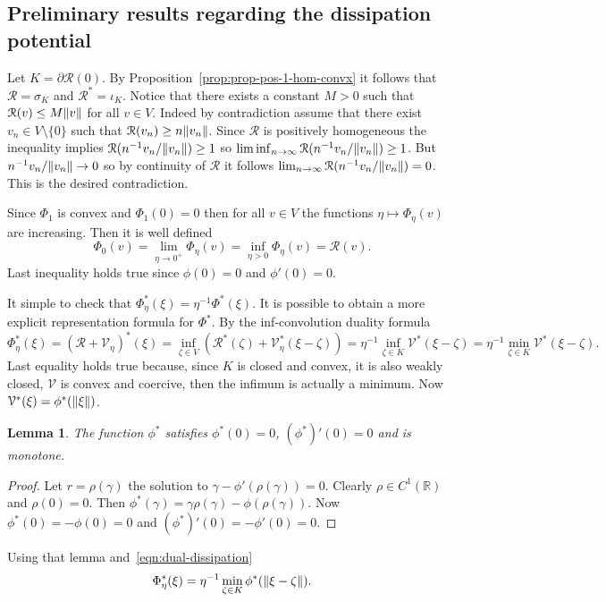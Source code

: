 \documentclass[letterpaper,oneside]{amsart}
\numberwithin{equation}{section}
\newtheorem{lemma}[theorem]{Lemma}
\theoremstyle{definition}
\DeclarePairedDelimiter{\norm}{\lVert}{\rVert}
\begin{document}
\subsection{Preliminary results regarding the dissipation potential}

Let $K=\partial\mathcal{R}(0)$. By Proposition~\ref{prop:prop-pos-1-hom-convx} it follows that $\mathcal{R}=\sigma_K$ and $\mathcal{R}^*=\iota_K$. Notice that there exists a constant $M>0$ such that $\mathcal{R}(v)\le M\norm{v}$ for all $v\in V$. Indeed by contradiction assume that there exist $v_n\in V\setminus\{0\}$ such that $\mathcal{R}(v_n)\ge n\norm{v_n}$. Since $\mathcal{R}$ is positively homogeneous the inequality implies $\mathcal{R}(n^{-1}v_n/\norm{v_n})\ge1$ so $\liminf_{n\to\infty}\mathcal{R}(n^{-1}v_n/\norm{v_n})\ge1$. But $n^{-1}v_n/\norm{v_n}\to0$ so by continuity of $\mathcal{R}$ it follows $\lim_{n\to\infty}\mathcal{R}(n^{-1}v_n/\norm{v_n})=0$. This is the desired contradiction.

Since $\Phi_1$ is convex and $\Phi_1(0)=0$ then for all $v\in V$ the functions $\eta\mapsto\Phi_\eta(v)$ are increasing. Then it is well defined
\begin{equation*}
\Phi_0(v)=\lim_{\eta\to0^+}\Phi_\eta(v)=\inf_{\eta>0}\Phi_\eta(v)=\mathcal{R}(v).
\end{equation*}
Last inequality holds true since $\phi(0)=0$ and $\phi'(0)=0$.

It simple to check that $\Phi_\eta^*(\xi)=\eta^{-1}\Phi^*(\xi)$. It is possible to obtain a more explicit representation formula for $\Phi^*$. By the inf-convolution duality formula
\begin{equation}
\label{eqn:dual-dissipation}
\Phi_\eta^*(\xi)=\left(\mathcal{R}+\mathcal{V}_\eta\right)^*(\xi)=\inf_{\zeta\in V}\left(\mathcal{R}^*(\zeta)+\mathcal{V}_\eta^*(\xi-\zeta)\right)=\eta^{-1}\inf_{\zeta\in K}\mathcal{V}^*(\xi-\zeta)=\eta^{-1}\min_{\zeta\in K}\mathcal{V}^*(\xi-\zeta).
\end{equation}
Last equality holds true because, since $K$ is closed and convex, it is also weakly closed, $\mathcal{V}$ is convex and coercive, then the infimum is actually a minimum. Now $\mathcal{V}^*(\xi)=\phi^*(\norm{\xi})$. \begin{lemma}
The function $\phi^*$ satisfies $\phi^*(0)=0$, $(\phi^*)'(0)=0$ and is monotone.
\end{lemma}
\begin{proof}
Let $r=\rho(\gamma)$ the solution to $\gamma-\phi'(\rho(\gamma))=0$. Clearly $\rho\in C^1(\mathbb{R})$ and $\rho(0)=0$. Then $\phi^*(\gamma)=\gamma\rho(\gamma)-\phi(\rho(\gamma))$. Now $\phi^*(0)=-\phi(0)=0$ and $(\phi^*)'(0)=-\phi'(0)=0$.
\end{proof}
Using that lemma and~\eqref{eqn:dual-dissipation}
\begin{equation}
\label{eqn:dual-dissipation-1}
\Phi_\eta^*(\xi)=\eta^{-1}\min_{\zeta\in K}\phi^*(\norm{\xi-\zeta}).
\end{equation}
\end{document}
